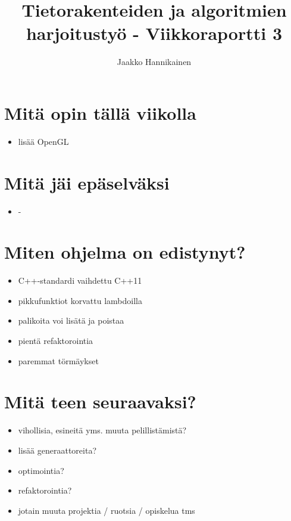 \documentclass{article}
\author{Jaakko Hannikainen}
\title{Tietorakenteiden ja algoritmien harjoitustyö - Viikkoraportti 3}
\begin{document}
\maketitle

\section{Mitä opin tällä viikolla}
\begin{itemize}
    \item lisää OpenGL
\end{itemize}

\section{Mitä jäi epäselväksi}
\begin{itemize}
    \item -
\end{itemize}

\section{Miten ohjelma on edistynyt?}
\begin{itemize}
    \item C++-standardi vaihdettu C++11
    \item pikkufunktiot korvattu lambdoilla
    \item palikoita voi lisätä ja poistaa
    \item pientä refaktorointia
    \item paremmat törmäykset
\end{itemize}

\section{Mitä teen seuraavaksi?}
\begin{itemize}
    \item vihollisia, esineitä yms. muuta pelillistämistä?
    \item lisää generaattoreita?
    \item optimointia?
    \item refaktorointia?
    \item jotain muuta projektia / ruotsia / opiskelua tms
\end{itemize}
\end{document}
